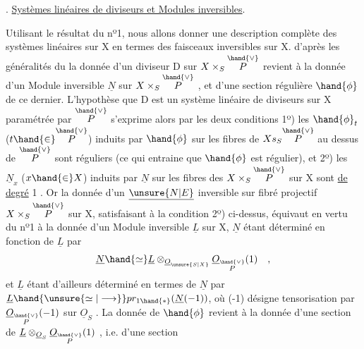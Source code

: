 
. \uline{Systèmes linéaires de diviseurs et Modules inversibles}.

Utilisant le résultat du nº1, nous allons donner une description
complète des systèmes linéaires sur X en termes des faisceaux inversibles
sur X.   d'après les généralités du  la donnée d'un
diviseur  D sur $X\times_S\overset{\hand{\vee}}{P}$  revient à la
donnée d'un Module inversible $\underline{N}$ sur $X\times_S\overset{\hand{\vee}}{P}$ , et d'une section régulière
$\hand{\phi}$ de ce dernier.  L'hypothèse que D est un système linéaire de
diviseurs sur X paramétrée par $\overset{\hand{\vee}}{P}$ s'exprime alors par les deux conditions
1º) les $\hand{\phi}_t$ ($t\hand{\in}\overset{\hand{\vee}}{P}$) induits par $\hand{\phi}$ sur les fibres de $Xs_S\overset{\hand{\vee}}{P}$ au dessus de $\overset{\hand{\vee}}{P}$
sont réguliers (ce qui entraine que $\hand{\phi}$ est régulier), et 2º) les $\underline{N}_x$ ($x\hand{\in} X$)
induits par $\underline{N}$  sur les fibres des $X\times_S\overset{\hand{\vee}}{P}$ sur X sont \uline{de degré} 1 .
Or la donnée d'un $\underline{\unsure{N|E}}$ inversible sur  fibré projectif $X\times_S\overset{\hand{\vee}}{P}$ sur X,
satisfaisant à la condition 2º) ci-dessus, équivaut en vertu du nº1
à la donnée d'un Module inversible $\underline{L}$ sur X, $\underline{N}$ étant déterminé en fonction
de $\underline{L}$ par
\[ \underline{N}\hand{\simeq}\underline{L}\otimes_{\underline{O}_{\unsure{S|X}}}\underline{O}_{\overset{\hand{\vee}}{P}}(1) \quad , \]
et $\underline{L}$ étant d'ailleurs déterminé en termes de $\underline{N}$ par $\underline{L}\hand{\unsure{\simeq|\longrightarrow}} pr_{1\hand{*}}(\underline{N}(-1))$,
où (-1) désigne  tensorisation par $\underline{O}_{\overset{\hand{\vee}}{P}}(-1)$ sur $\underline{O}_S$ . La donnée de $\hand{\phi}$
revient à la donnée d'une section de $\underline{L}\otimes_{\underline{O}_S}\underline{O}_{\overset{\hand{\vee}}{P}}(1)$ , i.e. d'une section
